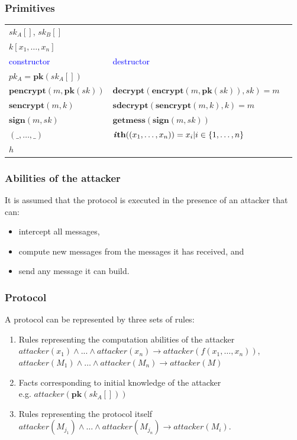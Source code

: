 \documentclass[10pt]{beamer}
\begin{document}
\newcommand{\fun}[1]{\textbf{#1}}

\begin{frame}
  \frametitle{Primitives}

  \begin{tabular}{lll}
    \multicolumn{2}{l}{$sk_A[]$, $sk_B[]$} \\
    \multicolumn{2}{l}{$k[x_1, \dots, x_n]$} \\[0.5em] \hline
    \textcolor{blue}{constructor} & \textcolor{blue}{destructor} \\
    $pk_A = \fun{pk}(sk_A[])$ & \\
    $\fun{pencrypt}(m, \fun{pk}(sk))$ & $\fun{decrypt}(\fun{encrypt}(m, \fun{pk}(sk)), sk) = m$ \\
    $\fun{sencrypt}(m, k)$ & $\fun{sdecrypt}(\fun{sencrypt}(m, k), k) = m$ \\
    $\fun{sign}(m, sk)$ & $\fun{getmess}(\fun{sign}(m, sk))$ \\
    $(\_, \dots, \_)$ & $\fun{\textit{i}th}((x_1, \dots, x_n)) = x_i | i \in \{1, \dots, n\}$ \\
    $h$ &
  \end{tabular}
\end{frame}

\begin{frame}
  \frametitle{Abilities of the attacker}

  It is assumed that the protocol is executed in the presence of an attacker that can:
  \begin{itemize}
    \item intercept all messages,
    \item compute new messages from the messages it has received, and
    \item send any message it can build.
  \end{itemize}
\end{frame}

\newcommand{\myvspace}{\\[0.5em]}

\begin{frame}
  \frametitle{Protocol}

  A protocol can be represented by three sets of rules:
  \begin{enumerate}
    \item Rules representing the computation abilities of the attacker \myvspace
      $attacker(x_1) \land ... \land attacker(x_n) \rightarrow attacker(f(x_1, \dots, x_n))$, \myvspace
      $attacker(M_1) \land \dots \land attacker(M_n) \rightarrow attacker(M)$ \myvspace
    \item Facts corresponding to initial knowledge of the attacker \myvspace
      e.g. $attacker(\fun{pk}(sk_A[]))$ \myvspace
    \item Rules representing the protocol itself \myvspace
      $attacker(M_{j_1}) \land \dots \land attacker(M_{j_n}) \rightarrow attacker(M_i)$.
  \end{enumerate}
\end{frame}
\end{document}
